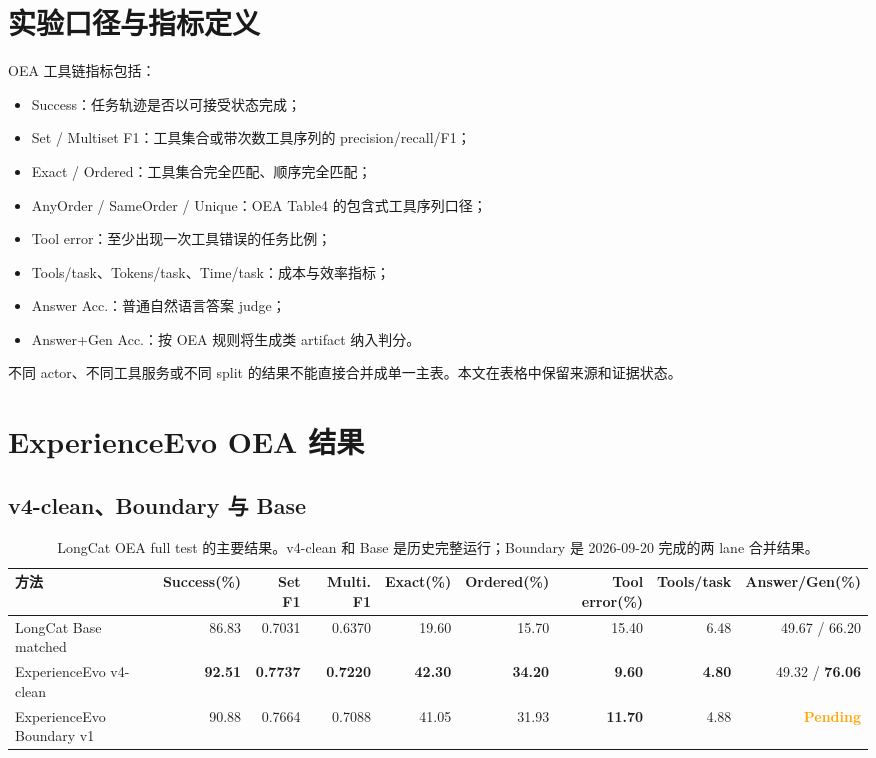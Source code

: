 \documentclass[a4paper,11pt]{article}
\newcommand{\pending}{\textcolor{orange}{\textbf{Pending}}}
\begin{document}
\begin{CJK*}{UTF8}{gbsn}
\section{实验口径与指标定义}

OEA 工具链指标包括：

\begin{itemize}
  \item Success：任务轨迹是否以可接受状态完成；
  \item Set / Multiset F1：工具集合或带次数工具序列的 precision/recall/F1；
  \item Exact / Ordered：工具集合完全匹配、顺序完全匹配；
  \item AnyOrder / SameOrder / Unique：OEA Table4 的包含式工具序列口径；
  \item Tool error：至少出现一次工具错误的任务比例；
  \item Tools/task、Tokens/task、Time/task：成本与效率指标；
  \item Answer Acc.：普通自然语言答案 judge；
  \item Answer+Gen Acc.：按 OEA 规则将生成类 artifact 纳入判分。
\end{itemize}

不同 actor、不同工具服务或不同 split 的结果不能直接合并成单一主表。本文在表格中保留来源和证据状态。

\section{ExperienceEvo OEA 结果}

\subsection{v4-clean、Boundary 与 Base}

\begin{table}[H]
\centering
\scriptsize
\caption{LongCat OEA full test 的主要结果。v4-clean 和 Base 是历史完整运行；Boundary 是 2026-09-20 完成的两 lane 合并结果。}
\begin{adjustbox}{max width=\textwidth}
\begin{tabular}{lrrrrrrrr}
\toprule
方法 & Success(\%) & Set F1 & Multi. F1 & Exact(\%) & Ordered(\%) & Tool error(\%) & Tools/task & Answer/Gen(\%)\\
\midrule
LongCat Base matched & 86.83 & 0.7031 & 0.6370 & 19.60 & 15.70 & 15.40 & 6.48 & 49.67 / 66.20\\
ExperienceEvo v4-clean & \textbf{92.51} & \textbf{0.7737} & \textbf{0.7220} & \textbf{42.30} & \textbf{34.20} & \textbf{9.60} & \textbf{4.80} & 49.32 / \textbf{76.06}\\
ExperienceEvo Boundary v1 & 90.88 & 0.7664 & 0.7088 & 41.05 & 31.93 & \textbf{11.70} & 4.88 & \pending\\
\bottomrule
\end{tabular}
\end{adjustbox}
\end{table}


\end{CJK*}
\end{document}

